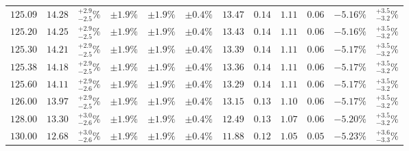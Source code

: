 \begin{landscape}
\begin{table}[ht!]
{\begin{tabular}{| cc | c | ccc | ccccc | c |}
$125.09$ & $14.28$ & $^{+2.9}_{-2.5}\%$ & $\pm 1.9\%$ & {\color{black!55}$\pm 1.9\%$} & {\color{black!55}$\pm 0.4\%$} & $13.47$ & $0.14$ & $1.11$ & $0.06$ & $-5.16\%$ & $^{+3.5}_{-3.2}\%$ \\
$125.20$ & $14.25$ & $^{+2.9}_{-2.5}\%$ & $\pm 1.9\%$ & {\color{black!55}$\pm 1.9\%$} & {\color{black!55}$\pm 0.4\%$} & $13.43$ & $0.14$ & $1.11$ & $0.06$ & $-5.16\%$ & $^{+3.5}_{-3.2}\%$ \\
$125.30$ & $14.21$ & $^{+2.9}_{-2.5}\%$ & $\pm 1.9\%$ & {\color{black!55}$\pm 1.9\%$} & {\color{black!55}$\pm 0.4\%$} & $13.39$ & $0.14$ & $1.11$ & $0.06$ & $-5.17\%$ & $^{+3.5}_{-3.2}\%$ \\
$125.38$ & $14.18$ & $^{+2.9}_{-2.5}\%$ & $\pm 1.9\%$ & {\color{black!55}$\pm 1.9\%$} & {\color{black!55}$\pm 0.4\%$} & $13.36$ & $0.14$ & $1.11$ & $0.06$ & $-5.17\%$ & $^{+3.5}_{-3.2}\%$ \\
$125.60$ & $14.11$ & $^{+2.9}_{-2.6}\%$ & $\pm 1.9\%$ & {\color{black!55}$\pm 1.9\%$} & {\color{black!55}$\pm 0.4\%$} & $13.29$ & $0.14$ & $1.11$ & $0.06$ & $-5.17\%$ & $^{+3.5}_{-3.2}\%$ \\
$126.00$ & $13.97$ & $^{+2.9}_{-2.5}\%$ & $\pm 1.9\%$ & {\color{black!55}$\pm 1.9\%$} & {\color{black!55}$\pm 0.4\%$} & $13.15$ & $0.13$ & $1.10$ & $0.06$ & $-5.17\%$ & $^{+3.5}_{-3.2}\%$ \\
$128.00$ & $13.30$ & $^{+3.0}_{-2.6}\%$ & $\pm 1.9\%$ & {\color{black!55}$\pm 1.9\%$} & {\color{black!55}$\pm 0.4\%$} & $12.49$ & $0.13$ & $1.07$ & $0.06$ & $-5.20\%$ & $^{+3.5}_{-3.2}\%$ \\
$130.00$ & $12.68$ & $^{+3.0}_{-2.6}\%$ & $\pm 1.9\%$ & {\color{black!55}$\pm 1.9\%$} & {\color{black!55}$\pm 0.4\%$} & $11.88$ & $0.12$ & $1.05$ & $0.05$ & $-5.23\%$ & $^{+3.6}_{-3.3}\%$ \\
\cline{1-12}
\end{tabular}
}
\end{table}


\end{landscape}
